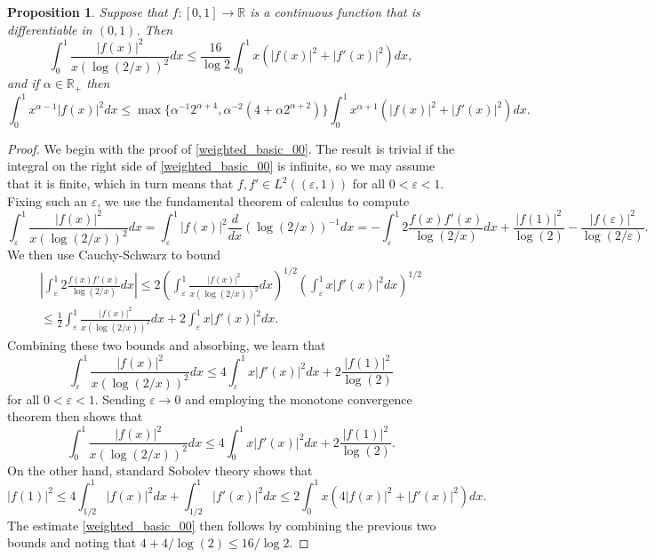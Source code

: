\documentclass[11pt,reqno]{amsart}
\numberwithin{equation}{section}
\providecommand{\abs}[1]{\left\vert#1\right\vert}
\def\ep{\varepsilon}
\providecommand{\abs}[1]{\left\vert#1\right\vert}
\def\ep{\varepsilon}
\def\R{\mathbb{R}}
\newtheorem{prop}[lem]{Proposition}
\begin{document}
\begin{prop}\label{weighted_basic}
Suppose that $f:[0,1] \to \R$ is a continuous function that is differentiable in $(0,1)$.  Then 
\begin{equation}\label{weighted_basic_00}
 \int_0^1 \frac{\abs{f(x)}^2}{x (\log(2/x))^2} dx \le \frac{16}{\log 2} \int_0^1 x (\abs{f(x)}^2 + \abs{f'(x)}^2) dx,
\end{equation}
and if $\alpha \in \R_+$ then
\begin{equation}\label{weighted_basic_01}
 \int_0^1 x^{\alpha-1} \abs{f(x)}^2 dx \le \max\{\alpha^{-1} 2^{\alpha +4}, \alpha^{-2}(4+\alpha 2^{\alpha+2} )  \}  \int_0^1 x^{\alpha+1} (\abs{f(x)}^2 + \abs{f'(x)}^2) dx.
\end{equation}

\end{prop}
\begin{proof}
We begin with the proof of \eqref{weighted_basic_00}. The result is trivial if the integral on the right side of \eqref{weighted_basic_00} is infinite, so we may assume that it is finite, which in turn means that $f,f' \in L^2((\ep,1))$ for all $0 < \ep < 1$.  Fixing such an $\ep$, we use the fundamental theorem of calculus to compute 
\begin{equation}
 \int_\ep^1 \frac{\abs{f(x)}^2}{x (\log(2/x))^2} dx = \int_\ep^1 \abs{f(x)}^2 \frac{d}{dx}(\log(2/x))^{-1} dx = - \int_\ep^1 2 \frac{f(x) f'(x)}{\log(2/x)}dx + \frac{\abs{f(1)}^2}{\log(2)} - \frac{\abs{f(\ep)}^2}{\log(2/\ep)}.
\end{equation}
We then use Cauchy-Schwarz to bound 
\begin{multline}
 \abs{ \int_\ep^1 2 \frac{f(x) f'(x)}{\log(2/x)}dx } \le 2 \left(  \int_\ep^1  \frac{\abs{f(x)}^2}{x (\log(2/x))^2} dx  \right)^{1/2}  \left(   \int_\ep^1  x\abs{f'(x)}^2  dx  \right)^{1/2} \\
 \le \frac{1}{2}  \int_\ep^1  \frac{\abs{f(x)}^2}{x (\log(2/x))^2} dx  + 2 \int_\ep^1  x\abs{f'(x)}^2  dx.
\end{multline}
Combining these two bounds and absorbing, we learn that 
\begin{equation}
  \int_\ep^1 \frac{\abs{f(x)}^2}{x (\log(2/x))^2} dx  \le 4 \int_\ep^1  x\abs{f'(x)}^2  dx + 2\frac{\abs{f(1)}^2}{\log(2)}  
\end{equation}
for all $0 < \ep < 1$.  Sending $\ep \to 0$ and employing the monotone convergence theorem then shows that 
\begin{equation}
  \int_0^1 \frac{\abs{f(x)}^2}{x (\log(2/x))^2} dx  \le 4 \int_0^1  x\abs{f'(x)}^2  dx + 2\frac{\abs{f(1)}^2}{\log(2)}.  
\end{equation}
On the other hand, standard Sobolev theory shows that 
\begin{equation}
 \abs{f(1)}^2 \le 4\int_{1/2}^1 \abs{f(x)}^2 dx + \int_{1/2}^1 \abs{f'(x)}^2 dx \le 2 \int_0^1 x (4\abs{f(x)}^2 + \abs{f'(x)}^2) dx.
\end{equation}
The estimate \eqref{weighted_basic_00} then follows by combining the previous two bounds and noting that $4+ 4/\log(2) \le 16/\log 2$.


\end{proof}
\end{document}
